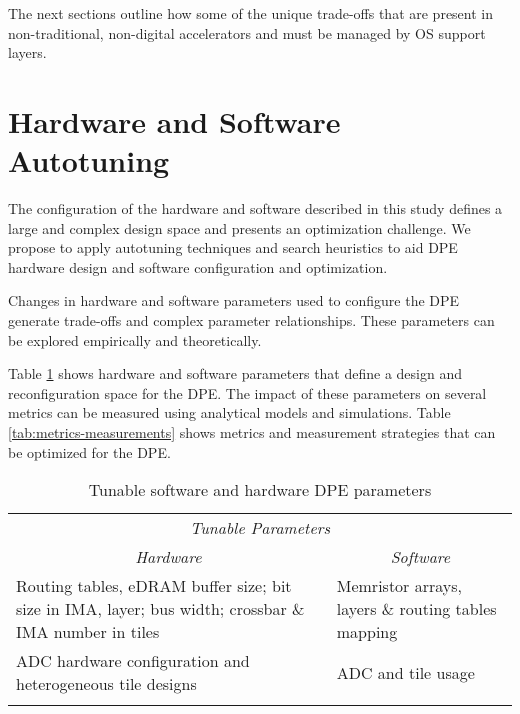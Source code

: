 The next sections outline how some of the unique trade-offs that are present in
non-traditional, non-digital accelerators and must be managed by OS support
layers.

\section{Hardware and Software Autotuning}\label{sec:autotuning}

The configuration of the hardware and software described in this study defines
a large and complex design space and presents an optimization challenge. We
propose to apply autotuning techniques and search heuristics to aid DPE
hardware design and software configuration and optimization.

Changes in hardware and software parameters used to configure the DPE generate
trade-offs and complex parameter relationships. These parameters can be
explored empirically and theoretically.

Table \ref{tab:hard-soft-params} shows hardware and software parameters that
define a design and reconfiguration space for the DPE. The impact of these
parameters on several metrics can be measured using analytical models and
simulations.  Table \ref{tab:metrics-measurements} shows metrics and
measurement strategies that can be optimized for the DPE.

\begin{table}[htpb]
\centering
\begin{tabular}{@{}p{}p{}@{}}
\toprule
\multicolumn{2}{c}{\textit{Tunable Parameters}} \\
\multicolumn{1}{c}{\textit{Hardware}} & \multicolumn{1}{c}{\textit{Software}} \\
Routing tables, eDRAM buffer size; bit size in IMA, layer; bus width; crossbar \& IMA number in tiles & Memristor arrays, layers \& routing tables mapping  \\
\addlinespace
ADC hardware configuration and heterogeneous tile designs & ADC and tile usage \\ \bottomrule
\addlinespace
\end{tabular}
\caption{Tunable software and hardware DPE parameters
}
\label{tab:hard-soft-params}
\end{table}

